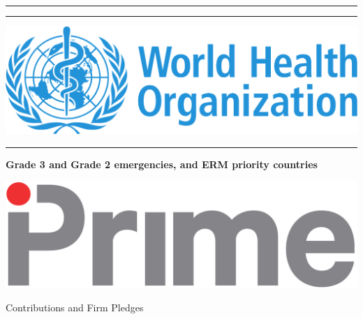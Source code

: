 \begin{titlepage}

\hspace*{-1cm}\begin{minipage}[t][0.1\textheight]{5cm}
\textcolor{whoblue!15}{\rule{5cm}{0.1\textheight}}
\end{minipage}
\hspace*{1cm}\begin{minipage}[t]{11.3cm}
\textcolor{whoblue}{\rule{11.3cm}{0.5mm}}
\end{minipage}

\hspace*{-1cm}\begin{minipage}[t][0.1\textheight]{5cm}
\vspace{0pt}
\includegraphics[height=0.1\textheight]{./logo_who}\\[0.55cm]
\textcolor{whoblue!15}{\rule{5cm}{0.1\textheight}}
\end{minipage}
\hspace*{1cm}\begin{minipage}[t][0.2\textheight]{11.3cm}{}
\vspace{0pt}
\begin{flushright}
\begin{spacing}{2.0}
{\Huge\bfseries Grade 3 and Grade 2 emergencies, and ERM priority countries}
\end{spacing}
\end{flushright}
\end{minipage}

\hspace*{-1cm}\begin{minipage}[0.1\textheight]{5cm}
\vspace{0pt}
\includegraphics[height=0.1\textheight]{./logo_prime}
\end{minipage}
\hspace*{1cm}\begin{minipage}{11.3cm}
\vspace{0pt}
\begin{flushright}
\begin{spacing}{1.0}
{\LARGE Contributions and Firm Pledges}
\end{spacing}
\end{flushright}
\end{minipage}


\end{titlepage}
